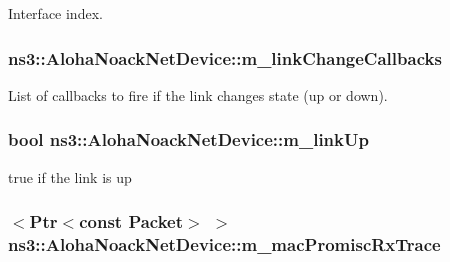Interface index. 

\subsubsection[{\texorpdfstring{m\+\_\+link\+Change\+Callbacks}{m_linkChangeCallbacks}}]{ ns3\+::\+Aloha\+Noack\+Net\+Device\+::m\+\_\+link\+Change\+Callbacks\hspace{0.3cm}{\ttfamily [private]}}\hypertarget{classns3_1_1AlohaNoackNetDevice_a018cc4ea94c6397c393dc4b222f055d4}{}\label{classns3_1_1AlohaNoackNetDevice_a018cc4ea94c6397c393dc4b222f055d4}
List of callbacks to fire if the link changes state (up or down). 
\subsubsection[{\texorpdfstring{m\+\_\+link\+Up}{m_linkUp}}]{\setlength{\rightskip}{0pt plus 5cm}bool ns3\+::\+Aloha\+Noack\+Net\+Device\+::m\+\_\+link\+Up\hspace{0.3cm}{\ttfamily [private]}}\hypertarget{classns3_1_1AlohaNoackNetDevice_a184bb6fe30ad8c5550093712196a78a9}{}\label{classns3_1_1AlohaNoackNetDevice_a184bb6fe30ad8c5550093712196a78a9}


true if the link is up 

\subsubsection[{\texorpdfstring{m\+\_\+mac\+Promisc\+Rx\+Trace}{m_macPromiscRxTrace}}]{$<${\bf Ptr}$<$const {\bf Packet}$>$ $>$ ns3\+::\+Aloha\+Noack\+Net\+Device\+::m\+\_\+mac\+Promisc\+Rx\+Trace\hspace{0.3cm}{\ttfamily [private]}}\hypertarget{classns3_1_1AlohaNoackNetDevice_a55830dfed6857f94fbbb3ca2346c2537}{}\label{classns3_1_1AlohaNoackNetDevice_a55830dfed6857f94fbbb3ca2346c2537}


